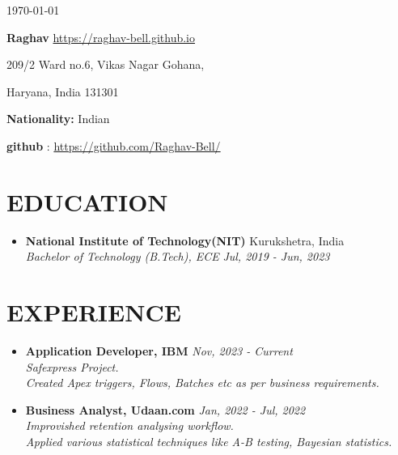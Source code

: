 \documentclass[12pt]{my_cv}
\begin{document}
\begin{flushright}
\today
\end{flushright}

\textbf{{\Huge Raghav}} \hfill \url{https://raghav-bell.github.io}

209/2 Ward no.6, Vikas Nagar Gohana,

Haryana, India 131301

\textbf{Nationality:} Indian

\textbf{github} : \url{https://github.com/Raghav-Bell/}
\section{EDUCATION}
\begin{itemize}
\item \textbf{National Institute of Technology(NIT)} \hfill Kurukshetra, India
\\\textit{Bachelor of Technology (B.Tech), ECE} \hfill \textit{Jul, 2019 - Jun, 2023}
\end{itemize}
\section{EXPERIENCE}
\begin{itemize}
\item \textbf{Application Developer, IBM} \hfill \textit{Nov, 2023 - Current}
\\\textit{Safexpress Project.
\\Created Apex triggers, Flows, Batches etc as per business requirements.}
\item \textbf{Business Analyst, Udaan.com} \hfill \textit{Jan, 2022 - Jul, 2022}
\\\textit{Improvished retention analysing workflow.
\\Applied various statistical techniques like A-B testing, Bayesian statistics.}

\end{itemize}
\end{document}
